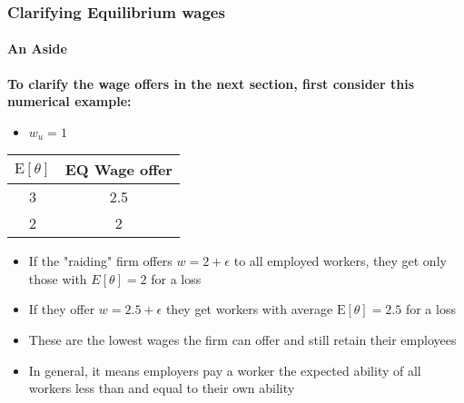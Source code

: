 \documentclass{beamer}
\newcommand{\E}{\mathrm{E}}
\begin{document}
\begin{frame}
\frametitle{Clarifying Equilibrium wages}
\framesubtitle{An Aside}

\textbf{To clarify the wage offers in the next section, first consider this numerical example: }

\begin{itemize}
	\item $w_u = 1 $
\end{itemize}

\begin{center}
	\begin{tabular}{||c | c||} 
		\hline
		$\E[\theta]$ & EQ Wage offer  \\ [0.5ex] 
		\hline\hline
		3 & 2.5 \\ 
		\hline 
		2 & 2\\[1ex] 
		\hline
	\end{tabular}
	
\end{center}

\begin{itemize}
	
	\item If the "raiding" firm offers $w = 2 + \epsilon$ to all  employed workers, they get only those with $E[\theta] = 2$ for a loss 
	
	\item If they offer $ w = 2.5 + \epsilon$ they get workers with average $\E[\theta] = 2.5$ for a loss
	
	\item These are the lowest wages the firm can offer and still retain their employees
	
	\item In general, it means employers pay a worker the expected ability of all workers less than and equal to their own ability
	
\end{itemize}
\end{frame}
\end{document}
